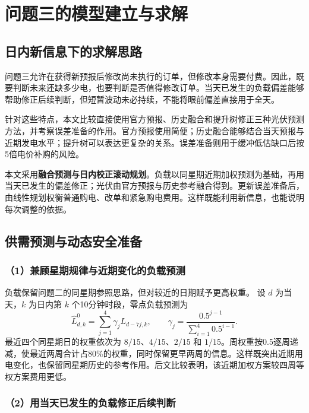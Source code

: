 \section{问题三的模型建立与求解}

\subsection{日内新信息下的求解思路}

问题三允许在获得新预报后修改尚未执行的订单，但修改本身需要付费。因此，既要判断未来还缺多少电，也要判断是否值得修改订单。当天已发生的负载偏差能够帮助修正后续判断，但短暂波动未必持续，不能将眼前偏差直接用于全天。

针对这些特点，本文比较直接使用官方预报、历史融合和提升树修正三种光伏预测方法，并考察误差准备的作用。官方预报使用简便；历史融合能够结合当天预报与近期发电水平；提升树可以表达更复杂的关系。误差准备则用于缓冲低估缺口后按5倍电价补购的风险。

本文采用\textbf{融合预测与日内校正滚动规划}。负载以同星期近期加权预测为基础，再用当天已发生的偏差修正；光伏由官方预报与历史参考融合得到。更新误差准备后，由线性规划权衡普通购电、改单和紧急购电费用。这样既能利用新信息，也能说明每次调整的依据。

\subsection{供需预测与动态安全准备}

\subsubsection*{（1）兼顾星期规律与近期变化的负载预测}

负载保留问题二的同星期参照思路，但对较近的日期赋予更高权重。
设 $d$ 为当天，$k$ 为日内第 $k$ 个10分钟时段，零点负载预测为
\begin{equation}
\widehat L^{0}_{d,k}
=\sum_{j=1}^{4}\gamma_jL_{d-7j,k},\qquad
\gamma_j=\frac{0.5^{j-1}}{\sum_{i=1}^{4}0.5^{i-1}}.
\end{equation}
最近四个同星期日的权重依次为 $8/15$、$4/15$、$2/15$ 和 $1/15$。周权重按0.5逐周递减，使最近两周合计占80\%的权重，同时保留更早两周的信息。这样既突出近期用电变化，也保留同星期历史的参考作用。后文比较表明，该近期加权方案较四周等权方案费用更低。

\subsubsection*{（2）用当天已发生的负载修正后续判断}

